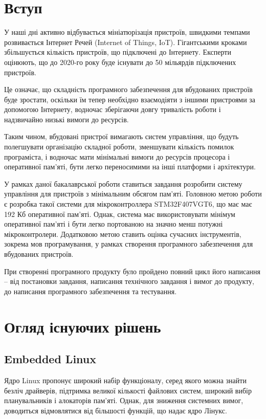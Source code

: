 \documentclass[oneside,14pt,a4paper,final]{myextreport}
\newcommand{\specialchapter}[1]{\chapter*{#1}\addcontentsline{toc}{chapter}{#1}}
\begin{document}
\specialchapter{Вступ}

У наші дні активно відбувається мініатюрізація пристроїв, швидкими темпами розвивається Інтернет Речей (Internet of Things, IoT). Гігантськими кроками збільшується кількість пристроїв, що підключені до Інтернету. Експерти оцінюють, що до 2020-го року буде існувати до 50 мільярдів підключених пристроїв\cite{dave-evans:IoT}.

Це означає, що складність програмного забезпечення для вбудованих пристроїв буде зростати, оскільки їм тепер необхідно взаємодіяти з іншими пристроями за допомогою Інтернету, водночас зберігаючи довгу тривалість роботи і надзвичайно низькі вимоги до ресурсів.

Таким чином, вбудовані пристрої вимагають систем управління, що будуть полегшувати організацію складної роботи, зменшувати кількість помилок програміста, і водночас мати мінімальні вимоги до ресурсів процесора і оперативної пам'яті, бути легко переносимими на інші платформи і архітектури.

У рамках даної бакалаврської роботи ставиться завдання розробити систему управління для пристроїв з мінімальним обсягом пам'яті. Головною метою роботи є розробка такої системи для мікроконтроллера STM32F407VGT6, що має має 192 Кб оперативної пам'яті. Однак, система має використовувати мінімум оперативної пам'яті і бути легко портованою на значно менш потужні мікроконтролери. Додатковою метою ставить оцінка сучасних інструментів, зокрема мов програмування, у рамках створення програмного забезпечення для вбудованих пристроїв.

При створенні програмного продукту було пройдено повний цикл його написання -- від постановки завдання, написання технічного завдання і вимог до продукту, до написання програмного забезпечення та тестування.

\chapter{Огляд існуючих рішень}
\section{Embedded Linux}

Ядро Linux\cite{linux} пропонує широкий набір функціоналу, серед якого можна знайти безліч драйверів, підтримка великої кількості файлових систем, широкий вибір планувальників і алокаторів пам'яті. Однак, для зниження системних вимог, доводиться відмовлятися від більшості функцій, що надає ядро Лінукс.
\end{document}
